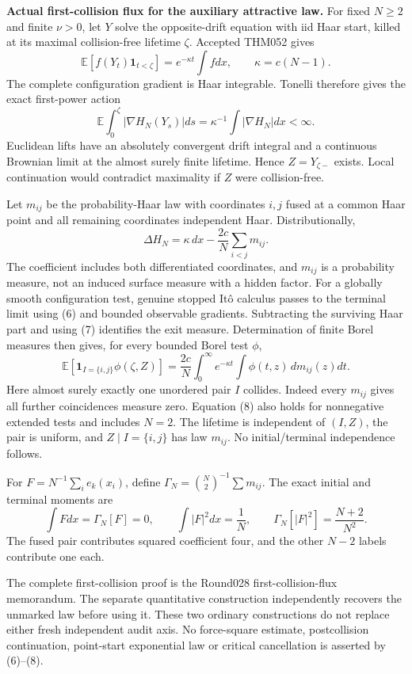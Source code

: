 \documentclass[11pt]{article}
\newcommand{\E}{\mathbb E}
\begin{document}
\newpage
\noindent\textbf{Actual first-collision flux for the auxiliary attractive law.}
For fixed $N\ge2$ and finite $\nu>0$, let $Y$ solve the opposite-drift equation with iid Haar start, killed at its maximal collision-free lifetime $\zeta$.
Accepted THM052 gives
\[
 \E[f(Y_t)\mathbf1_{t<\zeta}]=e^{-\kappa t}\int fdx,
 \qquad \kappa=c(N-1).
\]
The complete configuration gradient is Haar integrable. Tonelli therefore gives the exact first-power action
\[
 \E\int_0^\zeta|\nabla H_N(Y_s)|ds
       =\kappa^{-1}\int|\nabla H_N|dx<\infty.\tag{6}
\]
Euclidean lifts have an absolutely convergent drift integral and a continuous Brownian limit at the almost surely finite lifetime. Hence $Z=Y_{\zeta-}$ exists. Local continuation would contradict maximality if $Z$ were collision-free.

Let $m_{ij}$ be the probability-Haar law with coordinates $i,j$ fused at a common Haar point and all remaining coordinates independent Haar. Distributionally,
\[
 \Delta H_N=\kappa\,dx-\frac{2c}{N}\sum_{i<j}m_{ij}.\tag{7}
\]
The coefficient includes both differentiated coordinates, and $m_{ij}$ is a probability measure, not an induced surface measure with a hidden factor. For a globally smooth configuration test, genuine stopped It\^o calculus passes to the terminal limit using (6) and bounded observable gradients. Subtracting the surviving Haar part and using (7) identifies the exit measure. Determination of finite Borel measures then gives, for every bounded Borel test $\phi$,
\[
 \E[\mathbf1_{I=\{i,j\}}\phi(\zeta,Z)]
 =\frac{2c}{N}\int_0^\infty e^{-\kappa t}\int\phi(t,z)\,dm_{ij}(z)dt.\tag{8}
\]
Here almost surely exactly one unordered pair $I$ collides. Indeed every $m_{ij}$ gives all further coincidences measure zero. Equation (8) also holds for nonnegative extended tests and includes $N=2$. The lifetime is independent of $(I,Z)$, the pair is uniform, and $Z\mid I=\{i,j\}$ has law $m_{ij}$. No initial/terminal independence follows.

For $F=N^{-1}\sum_i e_k(x_i)$, define
$\Gamma_N=\binom{N}{2}^{-1}\sum m_{ij}$.
The exact initial and terminal moments are
\[
 \int Fdx=\Gamma_N[F]=0,\qquad
 \int|F|^2dx=\frac1N,\qquad \Gamma_N[|F|^2]=\frac{N+2}{N^2}.
\]
The fused pair contributes squared coefficient four, and the other $N-2$ labels contribute one each.

The complete first-collision proof is the Round028 first-collision-flux memorandum. The separate quantitative construction independently recovers the unmarked law before using it. These two ordinary constructions do not replace either fresh independent audit axis. No force-square estimate, postcollision continuation, point-start exponential law or critical cancellation is asserted by (6)--(8).
\end{document}
